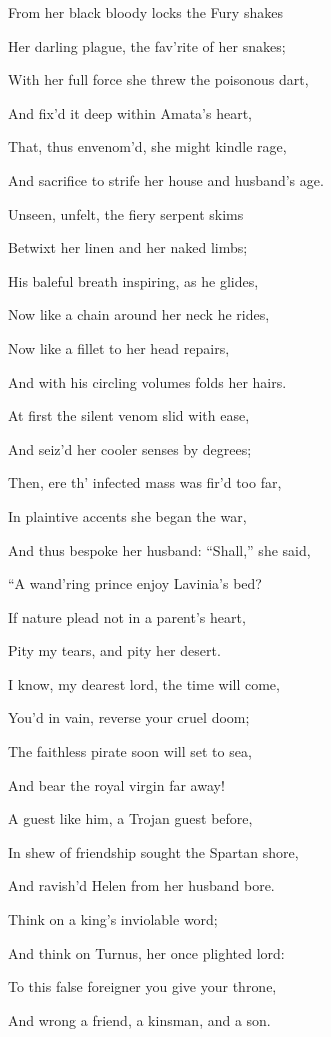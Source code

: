 From her black bloody locks the Fury shakes

Her darling plague, the fav’rite of her snakes;

With her full force she threw the poisonous dart,

And fix’d it deep within Amata’s heart,

That, thus envenom’d, she might kindle rage,

And sacrifice to strife her house and husband’s age.

Unseen, unfelt, the fiery serpent skims

Betwixt her linen and her naked limbs;

His baleful breath inspiring, as he glides,

Now like a chain around her neck he rides,

Now like a fillet to her head repairs,

And with his circling volumes folds her hairs.

At first the silent venom slid with ease,

And seiz’d her cooler senses by degrees;

Then, ere th’ infected mass was fir’d too far,

In plaintive accents she began the war,

And thus bespoke her husband: “Shall,” she said,

“A wand’ring prince enjoy Lavinia’s bed?

If nature plead not in a parent’s heart,

Pity my tears, and pity her desert.

I know, my dearest lord, the time will come,

You’d in vain, reverse your cruel doom;

The faithless pirate soon will set to sea,

And bear the royal virgin far away!

A guest like him, a Trojan guest before,

In shew of friendship sought the Spartan shore,

And ravish’d Helen from her husband bore.

Think on a king’s inviolable word;

And think on Turnus, her once plighted lord:

To this false foreigner you give your throne,

And wrong a friend, a kinsman, and a son.

